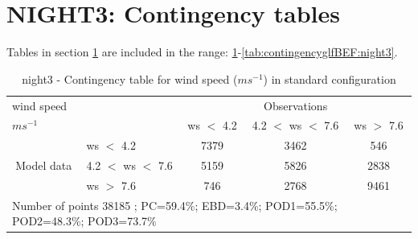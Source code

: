 \section{NIGHT3: Contingency tables}\label{sec:night3:cont}
Tables in section \ref{sec:night3:cont} are included in the range: \ref{tab:contingencywsBEF:night3}-\ref{tab:contingencyglfBEF:night3}.
\begin{table}[h!]
\begin{center}
\begin{tabular}{llccc}
\hline
{wind speed}                                       &                                                    & \multicolumn{3}{c}{Observations}                 \\
{$m s^{-1}$}                                       &                             & ws $<$ 4.2   & 4.2 $<$ ws $<$ 7.6 & ws $>$ 7.6 \\
\hline
\multicolumn{1}{c}{\multirow{3}{*}{Model data}}  & ws $<$ 4.2             & 7379                & 3462                       & 546              \\
                                                 & 4.2  $<$ ws $<$ 7.6 & 5159                & 5826                       & 2838              \\
                                                 & ws $>$ 7.6             & 746                & 2768                       & 9461              \\
\hline 
\multicolumn{5}{l}{ Number of points        38185 ; PC=59.4\%; EBD=3.4\%; POD1=55.5\%; POD2=48.3\%; POD3=73.7\%}                 \\
\end{tabular}
\end{center}
\caption{night3 - Contingency table for {wind speed} ($m s^{-1}$) in standard configuration}
\label{tab:contingencywsBEF:night3}
\end{table}
